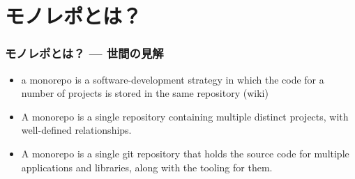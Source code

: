\section{モノレポとは？}
\begin{frame}
\frametitle{モノレポとは？ --- 世間の見解}
\begin{itemize}
    \item a monorepo is a software-development strategy in which the code for a number of projects is stored in the same repository (wiki)
    \item A monorepo is a single repository containing multiple distinct projects, with well-defined relationships.
    \item A monorepo is a single git repository that holds the source code for multiple applications and libraries, along with the tooling for them.
\end{itemize}

\end{frame}
